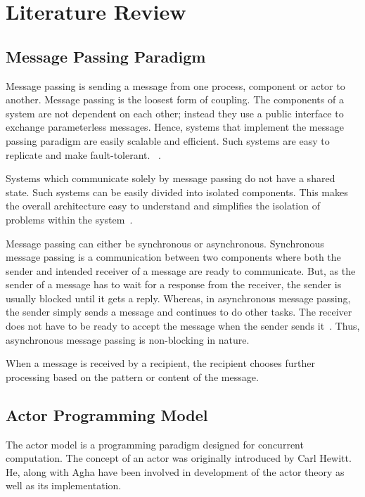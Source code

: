 \chapter{Literature Review}\label{chapter:literature_review}

\section{Message Passing Paradigm}
\label{sec:messagePassing}
  Message passing is sending a message from one process, component or actor to another. Message passing is the loosest form of coupling. The components of a system are not dependent on each other; instead they use a public interface to exchange parameterless messages\cite{joecelko}. Hence, systems that implement the message passing paradigm are easily scalable and efficient. Such systems are easy to replicate and make fault-tolerant.
~\cite{Armstrong:2010:ERL:1810891.1810910}.

  Systems which communicate solely by message passing do not have a shared state. Such systems can be easily divided into isolated components. This makes the overall architecture easy to understand and simplifies the isolation of problems within the system~\cite{Armstrong:2010:ERL:1810891.1810910}.

  Message passing can either be synchronous or asynchronous. Synchronous message passing is a communication between two components where both the sender and intended receiver of a message are ready to communicate. But, as the sender of a message has to wait for a response from the receiver, the sender is usually blocked until it gets a reply. Whereas, in asynchronous message passing, the sender simply sends a message and continues to do other tasks. The receiver does not have to be ready to accept the message when the sender sends it~\cite{agha}. Thus, asynchronous message passing is non-blocking in nature.

  When a message is received by a recipient, the recipient chooses further processing based on the pattern or content of the message.

\section{Actor Programming Model}
\label{sec:actorProgramming}
  The actor model is a programming paradigm designed for concurrent computation. The concept of an actor was originally introduced by Carl Hewitt\cite{hewitt}. He, along with Agha\cite{agha} have been involved in development of the actor theory as well as its implementation.

